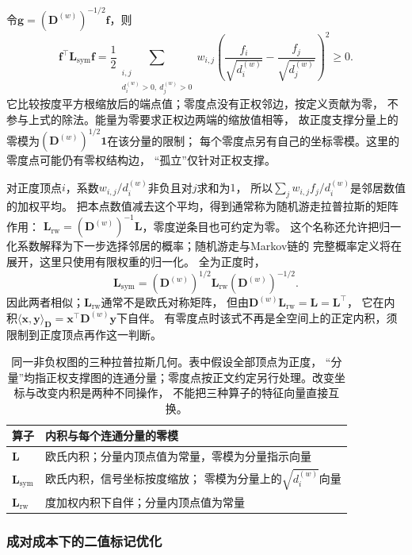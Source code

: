 令\(\bm g=(\bm D^{(w)})^{-1/2}\bm f\)，则
\[
  \bm f^\top\bm L_{\mathrm{sym}}\bm f
  =\frac12\sum_{\substack{i,j\\d_i^{(w)}>0,\ d_j^{(w)}>0}}
    w_{i,j}\left(\frac{f_i}{\sqrt{d_i^{(w)}}}
      -\frac{f_j}{\sqrt{d_j^{(w)}}}\right)^2\geq0.
\]
它比较按度平方根缩放后的端点值；零度点没有正权邻边，按定义贡献为零，
不参与上式的除法。能量为零要求正权边两端的缩放值相等，
故正度支撑分量上的零模为\((\bm D^{(w)})^{1/2}\bm1\)在该分量的限制；
每个零度点另有自己的坐标零模。这里的零度点可能仍有零权结构边，
“孤立”仅针对正权支撑。

对正度顶点\(i\)，系数\(w_{i,j}/d_i^{(w)}\)非负且对\(j\)求和为\(1\)，
所以\(\sum_j w_{i,j}f_j/d_i^{(w)}\)是邻居数值的加权平均。
把本点数值减去这个平均，得到通常称为随机游走拉普拉斯的矩阵作用：
\(\bm L_{\mathrm{rw}}=(\bm D^{(w)})^{-1}\bm L\)，零度逆条目也可约定为零。
这个名称还允许把归一化系数解释为下一步选择邻居的概率；随机游走与Markov链的
完整概率定义将在展开，这里只使用有限权重的归一化。
全为正度时，
\[
  \bm L_{\mathrm{sym}}
  =(\bm D^{(w)})^{1/2}\bm L_{\mathrm{rw}}(\bm D^{(w)})^{-1/2}.
\]
因此两者相似；\(\bm L_{\mathrm{rw}}\)通常不是欧氏对称矩阵，
但由\(\bm D^{(w)}\bm L_{\mathrm{rw}}=\bm L=\bm L^\top\)，
它在内积\(\langle\bm x,\bm y\rangle_{\bm D}
=\bm x^\top\bm D^{(w)}\bm y\)下自伴。
有零度点时该式不再是全空间上的正定内积，须限制到正度顶点再作这一判断。

\begin{table}[htbp]
  \centering\small
  \begin{tabularx}{\linewidth}{@{}lX@{}}
    \toprule
    算子 & 内积与每个连通分量的零模\\
    \midrule
    \(\bm L\) & 欧氏内积；分量内顶点值为常量，零模为分量指示向量\\
    \(\bm L_{\mathrm{sym}}\) & 欧氏内积，信号坐标按度缩放；
      零模为分量上的\(\sqrt{d_i^{(w)}}\)向量\\
    \(\bm L_{\mathrm{rw}}\) & 度加权内积下自伴；分量内顶点值为常量\\
    \bottomrule
  \end{tabularx}
  \caption{同一非负权图的三种拉普拉斯几何。表中假设全部顶点为正度，
  “分量”均指正权支撑图的连通分量；零度点按正文约定另行处理。改变坐标与改变内积是两种不同操作，
  不能把三种算子的特征向量直接互换。}
  \label{tab:graph-theory-laplacian-geometries}
\end{table}

\subsubsection{成对成本下的二值标记优化}

